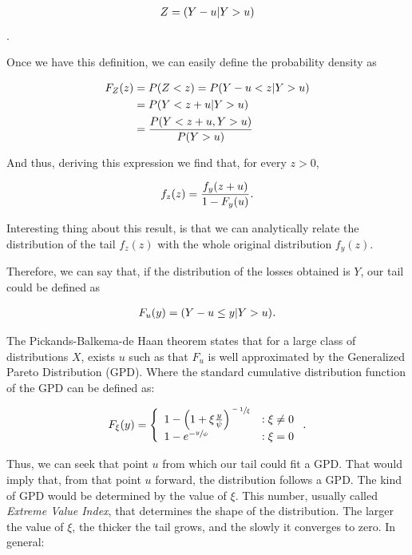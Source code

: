 \begin{align}
    Z = \qty(Y-u | Y>u)
\end{align}.

Once we have this definition, we can easily define the probability density as

\begin{align}
    F_Z(z)  &=  P(Z < z) = P\qty(Y-u < z | Y>u)  \\
            &=  P\qty(Y<z+u | Y>u) \\
            &= \frac{P\qty(Y<z+u, Y>u)}{P\qty(Y>u)}
\end{align}

And thus, deriving this expression we find that, for every $z>0$,

\begin{align}
    f_z(z) = \frac{f_y\qty(z+u)}{1-F_y(u)}\textit{.}
\end{align}

Interesting thing about this result, is that we can analytically relate the distribution of the tail $f_z(z)$ with the whole original distribution $f_y(z)$.

Therefore, we can say that, if the distribution of the losses obtained is $Y$, our tail could be defined as

\begin{align}
    F_u(y) = \qty( Y - u \leq y| Y > u ) \emph{.}
\end{align}

The Pickands-Balkema-de Haan theorem states that for a large class of distributions $X$, exists $u$ such as that $F_u$ is well approximated by the Generalized Pareto Distribution (GPD). Where the standard cumulative distribution function of the GPD can be defined as:


\[F_{\xi}(y) = \left\{
  \begin{array}{lr}
    1 - \qty(1 + \xi \frac{y}{\psi})^{\sfrac{-1}{\xi}} & : \xi \neq 0\\
    1 - e^{-\sfrac{y}{\psi}} & : \xi = 0
  \end{array}
\right. \emph{.}
\]

Thus, we can seek that point $u$ from which our tail could fit a GPD. That would imply that, from that point $u$ forward, the distribution follows a GPD. The kind of GPD would be determined by the value of $\xi$. This number, usually called \emph{Extreme Value Index}, that determines  the shape of the distribution. The larger the value of $\xi$, the thicker the tail grows, and the slowly it converges to zero. In general:

